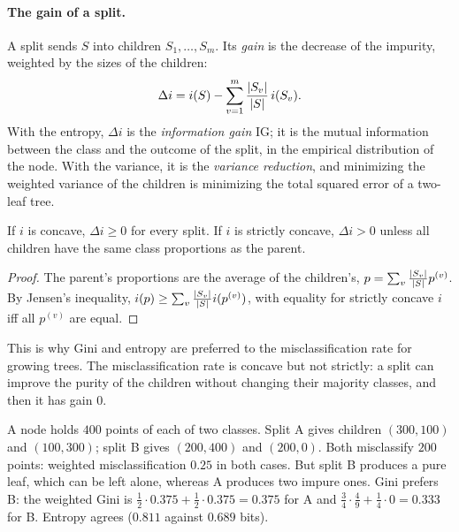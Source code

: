 \begin{notechapter}
\paragraph{The gain of a split.} A split sends $S$ into children $S_1,\dots,S_m$. Its \emph{gain} is the
decrease of the impurity, weighted by the sizes of the children:
\[
  \Delta i = i(S) - \sum_{v=1}^m\frac{\left|S_v\right|}{\left|S\right|}\,i(S_v) .
\]
With the entropy, $\Delta i$ is the \emph{information gain} $\mathrm{IG}$; it is the mutual information
between the class and the outcome of the split, in the empirical distribution of the
node. With the variance, it is the \emph{variance reduction}, and minimizing the weighted
variance of the children is minimizing the total squared error of a two-leaf tree.

\begin{proposition}\label{decision-trees:prop:concave}
If $i$ is concave, $\Delta i\geq0$ for every split. If $i$ is strictly concave, $\Delta i>0$ unless all children
have the same class proportions as the parent.
\end{proposition}

\begin{proof}
The parent's proportions are the average of the children's,
$p = \sum_v\frac{\left|S_v\right|}{\left|S\right|}p^{(v)}$. By Jensen's inequality, $i(p)\geq\sum_v\frac{\left|S_v\right|}{\left|S\right|}i(p^{(v)})$, with equality for strictly
concave $i$ iff all $p^{(v)}$ are equal.
\end{proof}

This is why Gini and entropy are preferred to the misclassification rate for growing
trees. The misclassification rate is concave but not strictly: a split can improve the
purity of the children without changing their majority classes, and then it has gain $0$.

\begin{example}\label{decision-trees:ex:esl}
A node holds $400$ points of each of two classes. Split A gives children $(300, 100)$ and
$(100, 300)$; split B gives $(200, 400)$ and $(200, 0)$. Both misclassify $200$ points: weighted
misclassification $0.25$ in both cases. But split B produces a pure leaf, which can be
left alone, whereas A produces two impure ones. Gini prefers B: the weighted Gini is
$\frac12\cdot0.375 + \frac12\cdot0.375 = 0.375$ for A and $\frac34\cdot\frac49 + \frac14\cdot0 = 0.333$ for B. Entropy agrees ($0.811$ against $0.689$
bits).
\end{example}


\end{notechapter}
